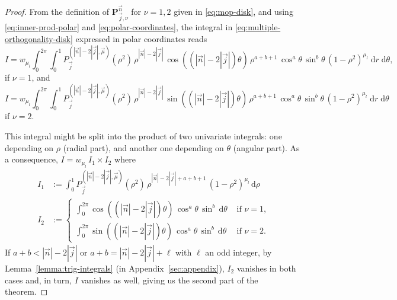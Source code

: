 \documentclass[a4paper]{article}
\theoremstyle{plain}
\theoremstyle{definition}
\newcommand{\ds}{\displaystyle}
\newcommand{\dr}{\mathrm{d}}
\newcommand{\drdth}{\;\mathrm{d} r\;\mathrm{d}\theta}
\begin{document}
    \begin{proof}
        From the definition of $\mathbf P_{\vec j,\nu}^{\vec n}$  for $\nu=1,2$ given in  \eqref{eq:mop-disk}, %
        and using \eqref{eq:inner-prod-polar} and \eqref{eq:polar-coordinates}, the integral in \eqref{eq:multiple-orthogonality-disk} expressed in polar coordinates reads
        $$
        I= w_{\mu_l} \int_0^{2\pi}\int_0^1 P^{(|\vec n|-2|\vec j|, \vec \mu)}_{\vec j}(\rho^2)\, \rho^{|\vec n|-2|\vec j|}\,\cos((|\vec n|-2|\vec j|)\theta) \, \rho^{a+b+1} \,\cos^a\theta\, \sin^b\theta\, (1-\rho^2)^{\mu_l}\drdth, 
        $$
        if $\nu=1$, and 
        $$
        I =  w_{\mu_l} \int_0^{2\pi}\int_0^1 P^{(|\vec n|-2|\vec j|, \vec \mu)}_{\vec j}(\rho^2)\, \rho^{|\vec n|-2|\vec j|}\,\sin((|\vec n|-2|\vec j|)\theta) \, \rho^{a+b+1} \,\cos^a\theta\, \sin^b\theta\, (1-\rho^2)^{\mu_l}\drdth
        $$
        if $\nu=2$.
        
        This integral might be split into the product of two univariate integrals: one depending on $\rho$ (radial part), and another one depending on $\theta$ (angular part). As a consequence, $I=w_{\mu_l}\, I_1\times I_2$ where
        \begin{align*}
            I_1 &:= \int_0^1 P^{(|\vec n|-2|\vec j|, \vec \mu)}_{\vec j}(\rho^2)\, \rho^{|\vec n|-2|\vec j| + a+b+1}\,(1-\rho^2)^{\mu_l}\, \dr \rho \\
            I_2 &:= \begin{cases}
                \ds\int_0^{2\pi}  \cos((|\vec n|-2|\vec j|)\theta)\,\cos^a\theta\,\sin^b\,\dr\theta & \text{ if } \nu=1,\\
                \ds\int_0^{2\pi}  \sin((|\vec n|-2|\vec j|)\theta)\,\cos^a\theta\,\sin^b\,\dr\theta & \text{ if } \nu=2.
            \end{cases}
        \end{align*}
        If $a+b<|\vec n|-2|\vec j|$ or $a+b=|\vec n|-2|\vec j|+\ell$ with $\ell$ an odd integer, by Lemma~\ref{lemma:trig-integrals} (in Appendix~\ref{sec:appendix}), $I_2$ vanishes in both cases and, in turn, $I$ vanishes as well, giving us the second part of the theorem.


\end{proof}
\end{document}

